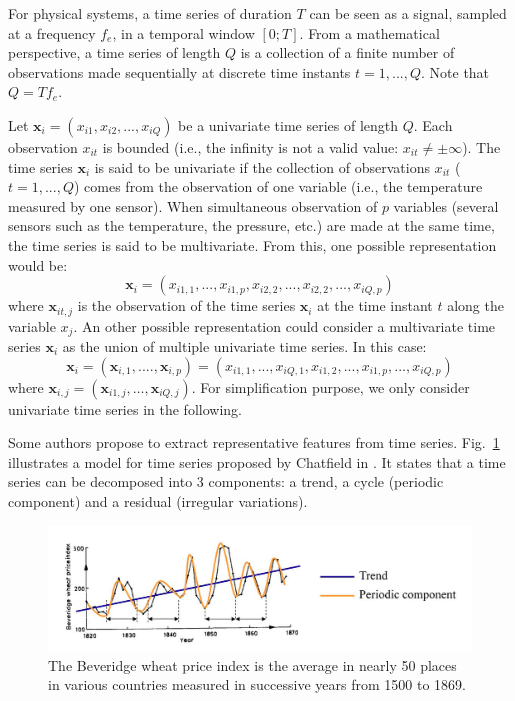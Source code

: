For physical systems, a time series of duration $T$ can be seen as a signal, sampled at a frequency $f_e$, in a temporal window $[0;T]$. From a mathematical perspective, a time series of length $Q$ is a collection of a finite number of observations made sequentially at discrete time instants $t=1,...,Q$. Note that $Q=Tf_e$. 

Let $\textbf{x}_i=(x_{i1}, x_{i2}, ..., x_{iQ})$ be a univariate time series of length $Q$. Each observation $x_{it}$ is bounded (i.e., the infinity is not a valid value: $x_{it} \neq \pm \infty$). The time series $\textbf{x}_i$ is said to be univariate if the collection of observations $x_{it}$ ($t=1,...,Q$) comes from the observation of one variable (i.e., the temperature measured by one sensor). When simultaneous observation of $p$ variables (several sensors such as the temperature, the pressure, etc.) are made at the same time, the time series is said to be multivariate. From this, one possible representation would be: 
\begin{equation*}
	\textbf{x}_i=(x_{i1,1}, ..., x_{i1,p},x_{i2,2}, ..., x_{i2,2}, ..., x_{iQ,p})
\end{equation*}
\noindent where $\textbf{x}_{it,j}$ is the observation of the time series $\textbf{x}_{i}$ at the time instant $t$ along the variable $x_j$. An other possible representation could consider a multivariate time series $\textbf{x}_i$ as the union of multiple univariate time series. In this case: 
\begin{equation*}
	\textbf{x}_i=(\textbf{x}_{i,1}, ...., \textbf{x}_{i,p})=(x_{i1,1}, ..., x_{iQ,1},x_{i1,2}, ..., x_{i1,p}, ..., x_{iQ,p})
\end{equation*}
where $\textbf{x}_{i,j} = (\textbf{x}_{i1,j}, \ldots, \textbf{x}_{iQ,j})$. For simplification purpose, we only consider univariate time series in the following. 


Some authors propose to extract representative features from time series. Fig.~\ref{fig:time_series_example} illustrates a model for time series proposed by Chatfield in \cite{Chatfield2004}. It states that a time series can be decomposed into 3 components: a trend, a cycle (periodic component) and a residual (irregular variations). 

\begin{figure}[h!]
	\centering
	\includegraphics[width=1\linewidth]{images/time_series_example}
	\caption{The Beveridge wheat price index is the average in nearly 50 places in various countries measured in successive years from 1500 to 1869. \protect\footnotemark}
	\label{fig:time_series_example}
\end{figure}

